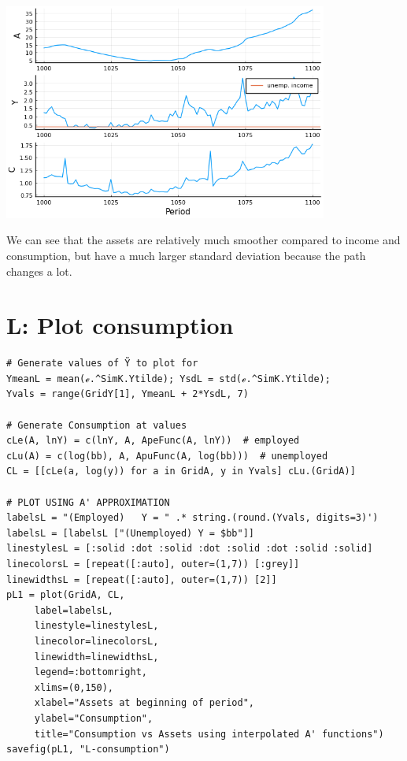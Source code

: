 \documentclass[12pt]{article}
\begin{document}
\includegraphics[width=0.8\textwidth]{problem sets/ps9/K-evolutions.png}

We can see that the assets are relatively much smoother compared to income and consumption, but have a much larger standard deviation because the path changes a lot.








\newpage
\section*{L: Plot consumption}



\begin{lstlisting}[language=JuliaLocal, style=julia]
# Generate values of Ỹ to plot for
YmeanL = mean(ℯ.^SimK.Ytilde); YsdL = std(ℯ.^SimK.Ytilde);
Yvals = range(GridY[1], YmeanL + 2*YsdL, 7)

# Generate Consumption at values
cLe(A, lnY) = c(lnY, A, ApeFunc(A, lnY))  # employed
cLu(A) = c(log(bb), A, ApuFunc(A, log(bb)))  # unemployed
CL = [[cLe(a, log(y)) for a in GridA, y in Yvals] cLu.(GridA)]

# PLOT USING A' APPROXIMATION
labelsL = "(Employed)   Y = " .* string.(round.(Yvals, digits=3)')
labelsL = [labelsL ["(Unemployed) Y = $bb"]]
linestylesL = [:solid :dot :solid :dot :solid :dot :solid :solid]
linecolorsL = [repeat([:auto], outer=(1,7)) [:grey]]
linewidthsL = [repeat([:auto], outer=(1,7)) [2]]
pL1 = plot(GridA, CL,
     label=labelsL,
     linestyle=linestylesL,
     linecolor=linecolorsL,
     linewidth=linewidthsL,
     legend=:bottomright,
     xlims=(0,150),
     xlabel="Assets at beginning of period",
     ylabel="Consumption",
     title="Consumption vs Assets using interpolated A' functions")
savefig(pL1, "L-consumption")
\end{lstlisting}
\end{document}
